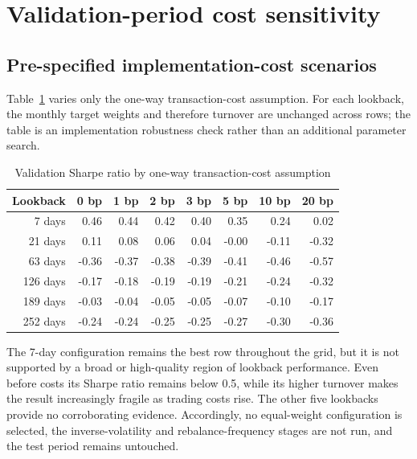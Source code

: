 \documentclass[11pt,a4paper]{article}
\begin{document}
\section{Validation-period cost sensitivity}

\subsection{Pre-specified implementation-cost scenarios}
Table~\ref{tab:validation-cost-sensitivity} varies only the one-way transaction-cost assumption. For each lookback, the monthly target weights and therefore turnover are unchanged across rows; the table is an implementation robustness check rather than an additional parameter search.

\begin{table}[htbp]
\centering
\caption{Validation Sharpe ratio by one-way transaction-cost assumption}
\label{tab:validation-cost-sensitivity}
\small
\begin{tabular}{@{}rrrrrrrr@{}}
\toprule
\rowcolor{ReportMist}
\textbf{Lookback} & \textbf{0 bp} & \textbf{1 bp} & \textbf{2 bp} & \textbf{3 bp} & \textbf{5 bp} & \textbf{10 bp} & \textbf{20 bp} \\
\midrule
7 days & 0.46 & 0.44 & 0.42 & 0.40 & 0.35 & 0.24 & 0.02 \\
21 days & 0.11 & 0.08 & 0.06 & 0.04 & -0.00 & -0.11 & -0.32 \\
63 days & -0.36 & -0.37 & -0.38 & -0.39 & -0.41 & -0.46 & -0.57 \\
126 days & -0.17 & -0.18 & -0.19 & -0.19 & -0.21 & -0.24 & -0.32 \\
189 days & -0.03 & -0.04 & -0.05 & -0.05 & -0.07 & -0.10 & -0.17 \\
252 days & -0.24 & -0.24 & -0.25 & -0.25 & -0.27 & -0.30 & -0.36 \\
\bottomrule
\end{tabular}
\end{table}

The 7-day configuration remains the best row throughout the grid, but it is not supported by a broad or high-quality region of lookback performance. Even before costs its Sharpe ratio remains below 0.5, while its higher turnover makes the result increasingly fragile as trading costs rise. The other five lookbacks provide no corroborating evidence. Accordingly, no equal-weight configuration is selected, the inverse-volatility and rebalance-frequency stages are not run, and the test period remains untouched.
\end{document}
